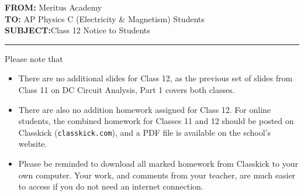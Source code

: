\documentclass[letterpaper,11pt]{article}
\begin{document}
\textbf{FROM:}\tabto{1.3in} Meritus Academy\\
\textbf{TO:}\tabto{1.3in} AP Physics C (Electricity \& Magnetism) Students\\
\textbf{SUBJECT:}\tabto{1.3in}Class 12 Notice to Students

\vspace{.2in}\hrule

Please note that

\begin{itemize}[itemsep=4pt,topsep=0pt,leftmargin=15pt]
\item There are no additional slides for Class 12, as the previous set of
  slides from Class 11 on DC Circuit Analysis, Part 1 covers both classes.

\item There are also no addition homework assigned for Class 12. For online
  students, the combined homework for Classes 11 and 12 should be posted on
  Classkick (\texttt{classkick.com}), and a PDF file is available on the
  school's website.

\item Please be reminded to download all marked homework from Classkick to your
  own computer. Your work, and comments from your teacher, are much easier to
  access if you do not need an internet connection.
\end{itemize}
\end{document}
